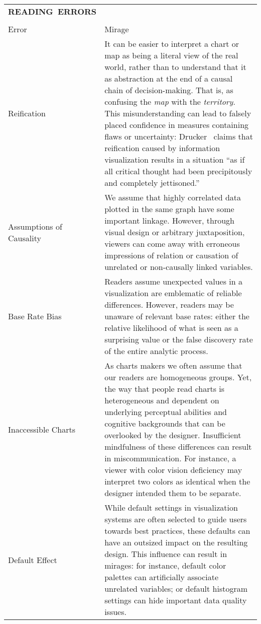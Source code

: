 \begin{longtable}{>{\raggedright\arraybackslash}p{3cm}p{14cm}}
  \\\hbox{\normalsize{\textbf{READING ERRORS}}}&\\ \\
  \normalsize{Error} & \normalsize{Mirage}\\ \hline
   \rowcolor{colord}Reification  & It can be easier to interpret a chart or map as being a literal view of the real world, rather than to understand that it as abstraction at the end of a causal chain of decision-making. That is, as confusing the \emph{map} with the \emph{territory}. This misunderstanding can lead to falsely placed confidence in measures containing flaws or uncertainty: Drucker~\cite{drucker2012humanistic} claims that reification caused by information visualization results in a situation ``as if all critical thought had been precipitously and completely jettisoned.'' \cite{drucker2012humanistic}\\
 \rowcolor{colord-opaque}Assumptions of Causality  & We assume that highly correlated data plotted in the same graph have some important linkage. However, through visual design or arbitrary juxtaposition, viewers can come away with erroneous impressions of relation or causation of unrelated or non-causally linked variables. \cite{xiong2019illusion, few2019loom}\\
 \rowcolor{colord}Base Rate Bias  & Readers assume unexpected values in a visualization are emblematic of reliable differences. However, readers may be unaware of relevant base rates: either the relative likelihood of what is seen as a surprising value or the false discovery rate of the entire analytic process. \cite{correll2016surprise,pu2018garden, zgraggen2018investigating}\\
 \rowcolor{colord-opaque}Inaccessible Charts  & As charts makers we often assume that our readers are homogeneous groups. Yet, the way that people read charts is heterogeneous and dependent on underlying perceptual abilities and cognitive backgrounds that can be overlooked by the designer. Insufficient mindfulness of these differences can result in miscommunication. For instance, a viewer with color vision deficiency may interpret two colors as identical when the designer intended them to be separate. \cite{lundgard2019Sociotechnical, plaisant2005information}\\
 \rowcolor{colord}Default Effect  & While default settings in visualization systems are often selected to guide users towards best practices, these defaults can have an outsized impact on the resulting design. This influence can result in mirages: for instance, default color palettes can artificially associate unrelated variables; or default histogram settings can hide important data quality issues. \cite{correll2018looks,few2019loom, hullman2011visualization,shah2006policy}\\

\end{longtable}
